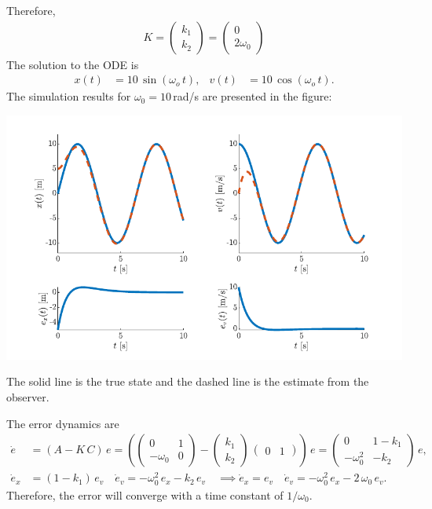 Therefore,
\begin{align*}
    K = \begin{pmatrix}
        k_1 \\ k_2
    \end{pmatrix} = \begin{pmatrix}
        0 \\ 2\omega_0
    \end{pmatrix}
\end{align*}
The solution to the ODE is 
\begin{align*}
    x(t) &= 10\,\sin(\omega_o\,t), & v(t) &= 10\,\cos(\omega_o\,t).
\end{align*}
The simulation results for $\omega_0 = 10$\,rad/s are presented in the figure:

\includegraphics{figures/ex417.pdf}

The solid line is the true state and the dashed line is the estimate from the observer. 

The error dynamics are 
\begin{align*}
    \dot e &= \left(A - K\,C\right)\,e = \left(\begin{pmatrix}
        0 & 1 \\ -\omega_0 & 0
    \end{pmatrix} - \begin{pmatrix}
        k_1 \\ k_2
    \end{pmatrix}\,\begin{pmatrix}
        0 & 1
    \end{pmatrix}\right)\,e = \begin{pmatrix}
        0 & 1 - k_1 \\ -\omega_0^2 & -k_2
    \end{pmatrix}\,e,\\
    \dot e_x &= (1 - k_1)\,e_v \quad \dot e_v = -\omega_0^2\,e_x - k_2\,e_v \quad \implies \dot e_x = e_v \quad \dot e_v = -\omega_0^2\,e_x - 2\,\omega_0\,e_v.
\end{align*}
Therefore, the error will converge with a time constant of $1/\omega_0$.

